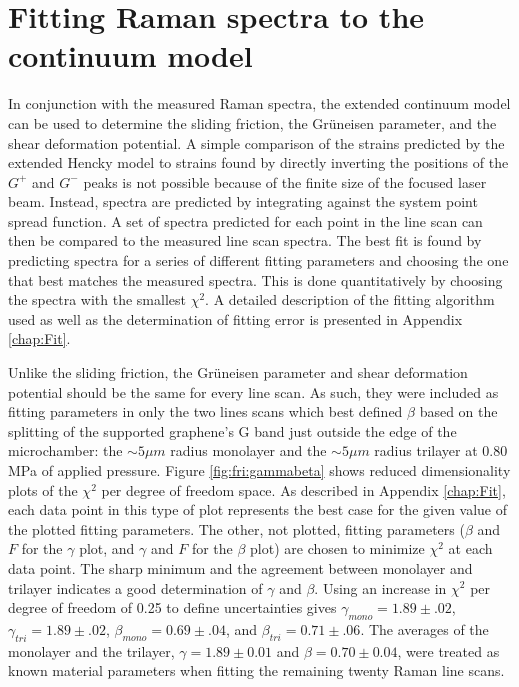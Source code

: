 \section{Fitting Raman spectra to the continuum model}
In conjunction with the measured Raman spectra, the extended continuum model can be used to determine the sliding friction, the Gr\"{u}neisen parameter, and the shear deformation potential.
A simple comparison of the strains predicted by the extended Hencky model to strains found by directly inverting the positions of the $G^+$ and $G^-$ peaks is not possible because of the finite size of the focused laser beam.
Instead, spectra are predicted by integrating against the system point spread function.
A set of spectra predicted for each point in the line scan can then be compared to the measured line scan spectra.
The best fit is found by predicting spectra for a series of different fitting parameters and choosing the one that best matches the measured spectra.
This is done quantitatively by choosing the spectra with the smallest $\chi^2$.
A detailed description of the fitting algorithm used as well as the determination of fitting error is presented in Appendix \ref{chap:Fit}.

Unlike the sliding friction, the Gr\"{u}neisen parameter and shear deformation potential should be the same for every line scan.
As such, they were included as fitting parameters in only the two lines scans which best defined $\beta$ based on the splitting of the supported graphene's G band just outside the edge of the microchamber: the $\sim 5 \mu m$ radius monolayer and the $\sim 5 \mu m$ radius trilayer at 0.80 MPa of applied pressure.
Figure \ref{fig:fri:gammabeta} shows reduced dimensionality plots of the $\chi^2$ per degree of freedom space.
As described in Appendix \ref{chap:Fit}, each data point in this type of plot represents the best case for the given value of the plotted fitting parameters.
The other, not plotted, fitting parameters ($\beta$ and $F$ for the $\gamma$ plot, and $\gamma$ and $F$ for the $\beta$ plot) are chosen to minimize $\chi^2$ at each data point.
The sharp minimum and the agreement between monolayer and trilayer indicates a good determination of $\gamma$ and $\beta$.
Using an increase in $\chi^2$ per degree of freedom of 0.25 to define uncertainties gives $\gamma_{mono} = 1.89 \pm .02$, $\gamma_{tri} = 1.89 \pm .02$, $\beta_{mono} = 0.69 \pm .04$, and $\beta_{tri} = 0.71 \pm .06$.
The averages of the monolayer and the trilayer, $\gamma=1.89 \pm 0.01$ and $\beta= 0.70 \pm 0.04$, were treated as known material parameters when fitting the remaining twenty Raman line scans.

